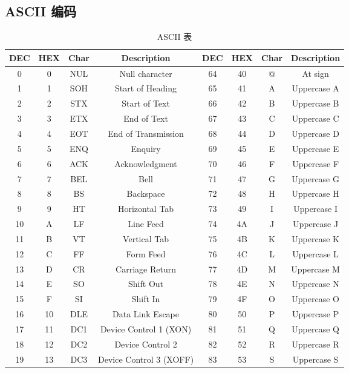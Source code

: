 \subsection{ASCII 编码}
\begin{table}[ht]
\centering
\caption{ASCII 表}\label{encode_tab1}
\begin{tabular}{|c|c|c|c|c|c|c|c|}
\hline
DEC & HEX & Char & Description & DEC & HEX & Char & Description \\
\hline
0 & 0 & NUL & Null character & 64 & 40 & @ & At sign \\ 
\hline
1 & 1 & SOH & Start of Heading & 65 & 41 & A & Uppercase A \\ 
\hline
2 & 2 & STX & Start of Text & 66 & 42 & B & Uppercase B \\ 
\hline
3 & 3 & ETX & End of Text & 67 & 43 & C & Uppercase C \\ 
\hline
4 & 4 & EOT & End of Transmission & 68 & 44 & D & Uppercase D \\ 
\hline
5 & 5 & ENQ & Enquiry & 69 & 45 & E & Uppercase E \\ 
\hline
6 & 6 & ACK & Acknowledgment & 70 & 46 & F & Uppercase F \\ 
\hline
7 & 7 & BEL & Bell & 71 & 47 & G & Uppercase G \\ 
\hline
8 & 8 & BS & Backspace & 72 & 48 & H & Uppercase H \\ 
\hline
9 & 9 & HT & Horizontal Tab & 73 & 49 & I & Uppercase I \\ 
\hline
10 & A & LF & Line Feed & 74 & 4A & J & Uppercase J \\ 
\hline
11 & B & VT & Vertical Tab & 75 & 4B & K & Uppercase K \\ 
\hline
12 & C & FF & Form Feed & 76 & 4C & L & Uppercase L \\ 
\hline
13 & D & CR & Carriage Return & 77 & 4D & M & Uppercase M \\ 
\hline
14 & E & SO & Shift Out & 78 & 4E & N & Uppercase N \\ 
\hline
15 & F & SI & Shift In & 79 & 4F & O & Uppercase O \\ 
\hline
16 & 10 & DLE & Data Link Escape & 80 & 50 & P & Uppercase P \\ 
\hline
17 & 11 & DC1 & Device Control 1 (XON) & 81 & 51 & Q & Uppercase Q \\ 
\hline
18 & 12 & DC2 & Device Control 2 & 82 & 52 & R & Uppercase R \\ 
\hline
19 & 13 & DC3 & Device Control 3 (XOFF) & 83 & 53 & S & Uppercase S \\ 

\end{tabular}
\end{table}
